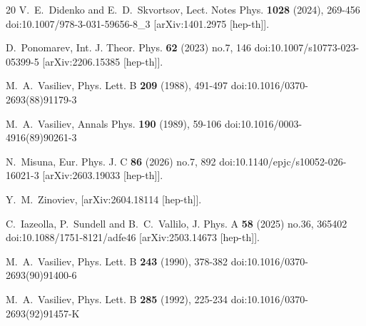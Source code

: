 \documentclass[12pt]{article}
\begin{document}
\begin{thebibliography}{20}
V.~E.~Didenko and E.~D.~Skvortsov,
Lect. Notes Phys. \textbf{1028} (2024), 269-456
doi:10.1007/978-3-031-59656-8{\_}3
[arXiv:1401.2975 [hep-th]].

D.~Ponomarev,
Int. J. Theor. Phys. \textbf{62} (2023) no.7, 146
doi:10.1007/s10773-023-05399-5
[arXiv:2206.15385 [hep-th]].

M.~A.~Vasiliev,
Phys. Lett. B \textbf{209} (1988), 491-497
doi:10.1016/0370-2693(88)91179-3

M.~A.~Vasiliev,
Annals Phys. \textbf{190} (1989), 59-106
doi:10.1016/0003-4916(89)90261-3

N.~Misuna,
Eur. Phys. J. C \textbf{86} (2026) no.7, 892
doi:10.1140/epjc/s10052-026-16021-3
[arXiv:2603.19033 [hep-th]].

Y.~M.~Zinoviev,
[arXiv:2604.18114 [hep-th]].

C.~Iazeolla, P.~Sundell and B.~C.~Vallilo,
J. Phys. A \textbf{58} (2025) no.36, 365402
doi:10.1088/1751-8121/adfe46
[arXiv:2503.14673 [hep-th]].

M.~A.~Vasiliev,
Phys. Lett. B \textbf{243} (1990), 378-382
doi:10.1016/0370-2693(90)91400-6

M.~A.~Vasiliev,
Phys. Lett. B \textbf{285} (1992), 225-234
doi:10.1016/0370-2693(92)91457-K


\end{thebibliography}
\end{document}
